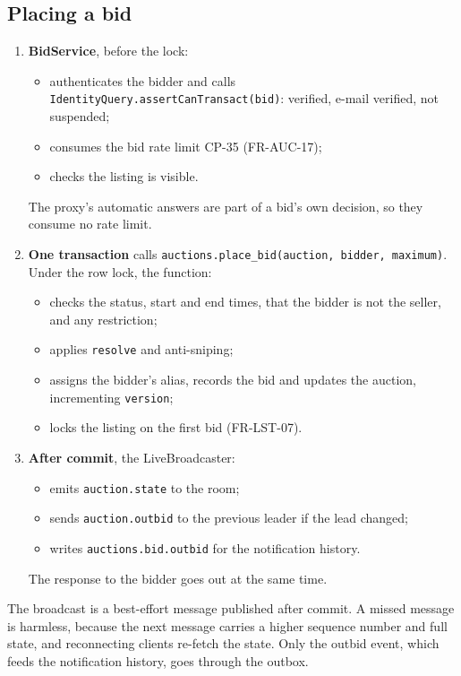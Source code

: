 \documentclass[11pt,a4paper]{article}
\begin{document}
\subsection{Placing a bid}
\label{sec:placing}
\begin{enumerate}[nosep]
  \item \textbf{BidService}, before the lock:
  \begin{itemize}[nosep]
    \item authenticates the bidder and calls \texttt{IdentityQuery.assertCanTransact(bid)}: verified, e-mail verified, not suspended;
    \item consumes the bid rate limit CP-35 (FR-AUC-17);
    \item checks the listing is visible.
  \end{itemize}
  The proxy's automatic answers are part of a bid's own decision, so they consume no rate limit.
  \item \textbf{One transaction} calls \texttt{auctions.place\_bid(auction, bidder, maximum)}. Under the row lock, the function:
  \begin{itemize}[nosep]
    \item checks the status, start and end times, that the bidder is not the seller, and any restriction;
    \item applies \texttt{resolve} and anti-sniping;
    \item assigns the bidder's alias, records the bid and updates the auction, incrementing \texttt{version};
    \item locks the listing on the first bid (FR-LST-07).
  \end{itemize}
  \item \textbf{After commit}, the LiveBroadcaster:
  \begin{itemize}[nosep]
    \item emits \texttt{auction.state} to the room;
    \item sends \texttt{auction.outbid} to the previous leader if the lead changed;
    \item writes \texttt{auctions.bid.outbid} for the notification history.
  \end{itemize}
  The response to the bidder goes out at the same time.
\end{enumerate}
The broadcast is a best-effort message published after commit. A missed message is harmless, because the next message carries a higher sequence number and full state, and reconnecting clients re-fetch the state. Only the outbid event, which feeds the notification history, goes through the outbox.
\end{document}
